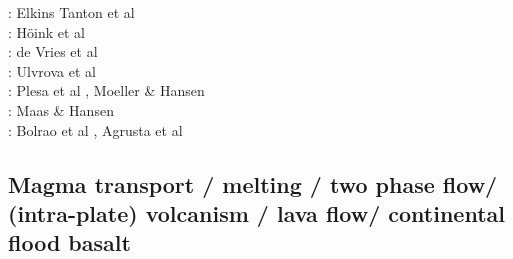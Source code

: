 \begin{scriptsize}
\twothousandtwo: Elkins Tanton et al \cite{elvh02}\\
\twothousandsix: H\"oink et al\cite{hosh06}\\
\twothousandten: de Vries et al \cite{devv10}\\
\twothousandtwelve: Ulvrova et al \cite{ullc12}\\
\twothousandthirteen: Plesa et al \cite{plth13}, Moeller \& Hansen \cite{moha13}\\
\twothousandfifteen: Maas \& Hansen \cite{maha15}\\
\twothousandtwenty: Bolrao et al \cite{bobm20}, Agrusta et al \cite{agml20}
\end{scriptsize}

\subsection{Magma transport / melting / two phase flow/ (intra-plate) volcanism / lava flow/ 
continental flood basalt}

